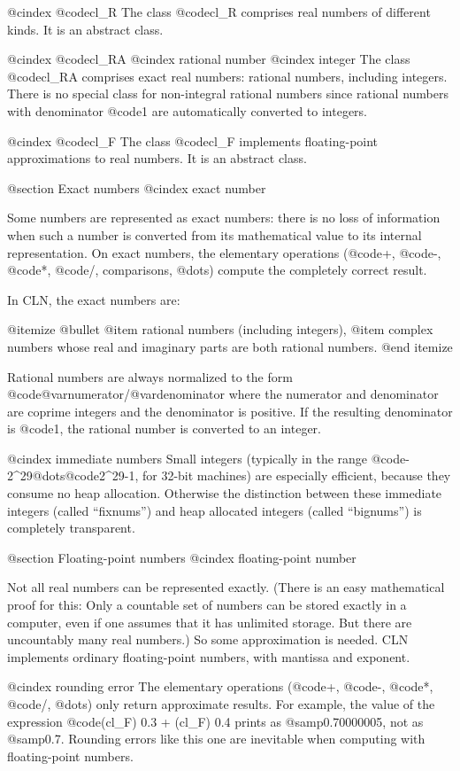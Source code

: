 @cindex @code{cl_R}
The class @code{cl_R} comprises real numbers of different kinds. It is an
abstract class.

@cindex @code{cl_RA}
@cindex rational number
@cindex integer
The class @code{cl_RA} comprises exact real numbers: rational numbers, including
integers. There is no special class for non-integral rational numbers
since rational numbers with denominator @code{1} are automatically converted
to integers.

@cindex @code{cl_F}
The class @code{cl_F} implements floating-point approximations to real numbers.
It is an abstract class.


@section Exact numbers
@cindex exact number

Some numbers are represented as exact numbers: there is no loss of information
when such a number is converted from its mathematical value to its internal
representation. On exact numbers, the elementary operations (@code{+},
@code{-}, @code{*}, @code{/}, comparisons, @dots{}) compute the completely
correct result.

In CLN, the exact numbers are:

@itemize @bullet
@item
rational numbers (including integers),
@item
complex numbers whose real and imaginary parts are both rational numbers.
@end itemize

Rational numbers are always normalized to the form
@code{@var{numerator}/@var{denominator}} where the numerator and denominator
are coprime integers and the denominator is positive. If the resulting
denominator is @code{1}, the rational number is converted to an integer.

@cindex immediate numbers
Small integers (typically in the range @code{-2^29}@dots{}@code{2^29-1},
for 32-bit machines) are especially efficient, because they consume no heap
allocation. Otherwise the distinction between these immediate integers
(called ``fixnums'') and heap allocated integers (called ``bignums'')
is completely transparent.


@section Floating-point numbers
@cindex floating-point number

Not all real numbers can be represented exactly. (There is an easy mathematical
proof for this: Only a countable set of numbers can be stored exactly in
a computer, even if one assumes that it has unlimited storage. But there
are uncountably many real numbers.) So some approximation is needed.
CLN implements ordinary floating-point numbers, with mantissa and exponent.

@cindex rounding error
The elementary operations (@code{+}, @code{-}, @code{*}, @code{/}, @dots{})
only return approximate results. For example, the value of the expression
@code{(cl_F) 0.3 + (cl_F) 0.4} prints as @samp{0.70000005}, not as
@samp{0.7}. Rounding errors like this one are inevitable when computing
with floating-point numbers.

